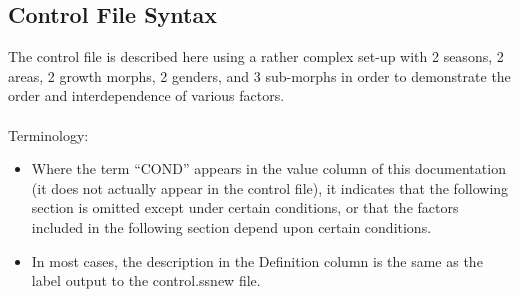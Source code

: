 \subsection{Control File Syntax}
The control file is described here using a rather complex set-up with 2 seasons, 2 areas, 2 growth morphs, 2 genders, and 3 sub-morphs in order to demonstrate the order and interdependence of various factors.
\\
\\
Terminology:
\begin{itemize}
	\item Where the term “COND” appears in the value column of this documentation (it does not actually appear in the control file), it indicates that the following section is omitted except under certain conditions, or that the factors included in the following section depend upon certain conditions.
	\item In most cases, the description in the Definition column is the same as the label output to the control.ss\textunderscore new file.
\end{itemize}


